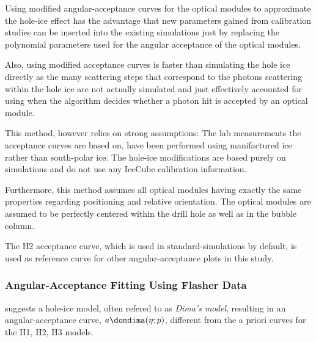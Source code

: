 Using modified angular-acceptance curves for the optical modules to approximate the hole-ice effect has the advantage that new parameters gained from calibration studies can be inserted into the existing simulations just by replacing the polynomial parameters used for the angular acceptance of the optical modules.

Also, using modified acceptance curves is faster than simulating the hole ice directly as the many scattering steps that correspond to the photons scattering within the hole ice are not actually simulated and just effectively accounted for using when the algorithm decides whether a photon hit is accepted by an optical module.

This method, however relies on strong assumptions: The lab measurements the acceptance curves are based on, have been performed using manifactured ice rather than south-polar ice. The hole-ice modifications are based purely on simulations and do not use any IceCube calibration information.

Furthermore, this method assumes all optical modules having exactly the same properties regarding positioning and relative orientation. The optical modules are assumed to be perfectly centered within the drill hole as well as in the bubble column.

The H2 acceptance curve, which is used in standard-\clsim simulations by default, is used as reference curve for other angular-acceptance plots in this study.


\subsubsection{Angular-Acceptance Fitting Using Flasher Data}
\label{sec:dimas_model}

%
%
%
%
%
\chirkin suggests a hole-ice model, often refered to as \textit{Dima's model}, resulting in an angular-acceptance curve, $a\domdima(\eta;p)$, different from the a priori curves for the H1, H2, H3 models.\cite{flasherdataderivedicemodels}

